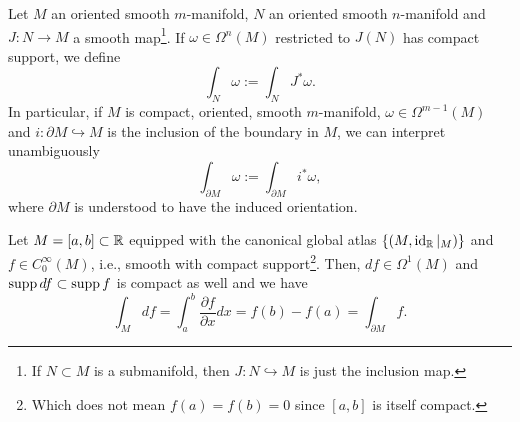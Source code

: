 \begin{definition}\label{def:insm}
  Let $M$ an oriented smooth $m$-manifold, $N$ an oriented smooth $n$-manifold and $J:N\to M$ a smooth map\footnote{If $N\subset M$ is a submanifold, then $J:N\hookrightarrow M$ is just the inclusion map.}.
  If $\omega\in\Omega^n(M)$ restricted to $J(N)$ has compact support, we define
  \begin{equation}
    \int_N \omega := \int_N J^*\omega.
  \end{equation}
  In particular, if $M$ is compact, oriented, smooth $m$-manifold, $\omega\in\Omega^{m-1}(M)$ and $i:\partial M\hookrightarrow M$ is the inclusion of the boundary in $M$, we can interpret unambiguously
  \begin{equation}
    \int_{\partial M} \omega := \int_{\partial M} i^* \omega,
  \end{equation}
  where $\partial M$ is understood to have the induced orientation.
\end{definition}

\begin{example}\label{ex:intint}
  Let $M=[a,b]\subset \mathbb{R}$ equipped with the canonical global atlas $\{(M, \operatorname{id}_{\mathbb{R}}|_M)\}$ and $f\in C^\infty_0(M)$, i.e., smooth with compact support\footnote{Which does not mean $f(a) = f(b)=0$ since $[a,b]$ is itself compact.}.
  Then, $df\in\Omega^1(M)$ and $\operatorname{supp} df \subset \operatorname{supp} f$ is compact as well and we have
  \begin{equation}
    \int_M df = \int_a^b \frac{\partial f}{\partial x} dx = f(b)- f(a) = \int_{\partial M} f.
  \end{equation}
\end{example}

